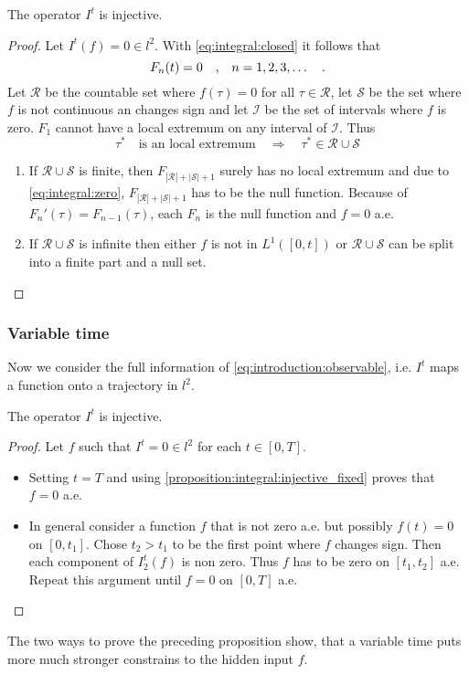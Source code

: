 \begin{proposition} \label{proposition:integral:injective_fixed}
The operator $I^t$ is injective.
\end{proposition}
\begin{proof}
Let $I^t(f)=0 \in l^2$. With \eqref{eq:integral:closed} it follows 
that
\begin{equation}
F_n(t) = 0 \quad \text{,} \quad n=1,2,3,\ldots \quad . \label{eq:integral:zero}
\end{equation}
Let $\mathcal{R}$ be the countable set where $f(\tau) = 0$ for all $
\tau\in\mathcal{R}$, let $\mathcal{S}$ be the set where $f$ is not 
continuous an changes sign and let $\mathcal{I}$ be the set of 
intervals where $f$ is zero.
$F_1$ cannot have a local extremum on any interval of 
$\mathcal{I}$. Thus
\begin{equation}
\tau^*\quad \text{is an local extremum} \quad \Rightarrow \quad 
\tau^* \in \mathcal{R}\cup\mathcal{S}
\end{equation} 

	\begin{enumerate}
	\item If $\mathcal{R}\cup \mathcal{S}$ is finite, then 
	$F_{|\mathcal{R}|+|\mathcal{S}|+1}$ surely has no local extremum 
	and 
	due to \eqref{eq:integral:zero}, $F_{|\mathcal{R}|+|
	\mathcal{S}|+1}$ has to be the null function. Because of 
	$F_n'(\tau) = 
	F_{n-1}(\tau)$, each $F_n$ is the null function and $f=0$ a.e.
	\item If $\mathcal{R}\cup \mathcal{S}$ is infinite then either $f$ 
	is not in $L^1([0,t])$ or $\mathcal{R}\cup \mathcal{S}$ can be 
	split into a finite part and a null set.
	\end{enumerate}
\end{proof}


\subsubsection{Variable time}\label{integral:variable}
\label{proposition:integral:injective}
Now we consider the full information of \eqref{eq:introduction:observable}, i.e. 
$I^t$ maps a function onto a trajectory in $l^2$. 
\begin{proposition}
	The operator $I^t$ is injective.
\end{proposition}
\begin{proof}
	Let $f$ such that $I^t=0\in l^2$ for each $t\in[0,T]$.
	\begin{itemize}
	\item Setting $t=T$ and using \ref{proposition:integral:injective_fixed} proves that 
	$f=0$ a.e.
	\item In general consider a function $f$ that is not zero a.e. but possibly $f(t)=0$ 
	on $[0,t_1]$. Chose $t_2>t_1$ to be the first 
	point where $f$ changes sign. Then each component of $I^t_2(f)$ is non zero. Thus $f$ 
	has to be zero 
	on $[t_1,t_2]$ a.e. Repeat this argument until $f=0$ on $[0,T]$ a.e.
	\end{itemize}
\end{proof}
The two ways to prove the preceding proposition show, that a variable time puts more 
much stronger constrains to the hidden input $f$.